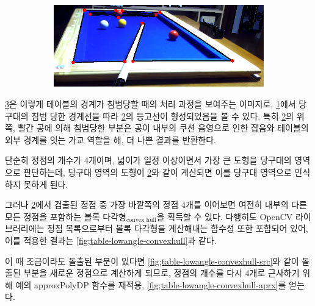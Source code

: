 \documentclass[10pt]{oblivoir}
\begin{document}
\begin{figure}[ht]
\begin{subfigure}{8cm}
        \caption{}
        \label{fig;table-lowangle-edge}
    \end{subfigure}
    \centering
    \begin{subfigure}{8cm}
        \includegraphics[width=\textwidth]{img/billiards-table-low-angle-approx.png}
        \caption{}
        \label{fig;table-lowangle-aprx}
    \end{subfigure}
    \caption{}
    \label{fig;table-lowangle}
\end{figure}

\cref{fig;table-lowangle}은 이렇게 테이블의 경계가 침범당할 때의 처리 과정을 보여주는 이미지로, \cref{fig;table-lowangle-edge}에서 당구대의 침범 당한 경계선을 따라 \cref{fig;table-lowangle-aprx}의 등고선이 형성되었음을 볼 수 있다. 특히 \cref{fig;table-lowangle-aprx}의 위쪽, 빨간 공에 의해 침범당한 부분은 공이 내부의 쿠션 음영으로 인한 잡음와 테이블의 외부 경계를 잇는 가교 역할을 해, 더 나쁜 결과를 반환한다.

단순히 정점의 개수가 4개이며, 넓이가 일정 이상이면서 가장 큰 도형을 당구대의 영역으로 판단하는데, 당구대 영역의 도형이 \cref{fig;table-lowangle-aprx}와 같이 계산되면 이를 당구대 영역으로 인식하지 못하게 된다.

그러나 \cref{fig;table-lowangle-aprx}에서 검출된 정점 중 가장 바깥쪽의 정점 4개를 이어보면 여전히 내부의 다른 모든 정점을 포함하는 볼록 다각형$_\text{convex hull}$을 획득할 수 있다. 다행히도 OpenCV 라이브러리에는 정점 목록으로부터 볼록 다각형을 계산해내는 함수성 또한 포함되어 있어, 이를 적용한 결과는 \cref{fig;table-lowangle-convexhull}과 같다.

이 때 조금이라도 돌출된 부분이 있다면 \cref{fig;table-lowangle-convexhull-src}와 같이 돌출된 부분을 새로운 정점으로 계산하게 되므로, 정점의 개수를 다시 4개로 근사하기 위해 예의 approxPolyDP 함수를 재적용, \cref{fig;table-lowangle-convexhull-aprx}를 얻는다.
\end{document}
